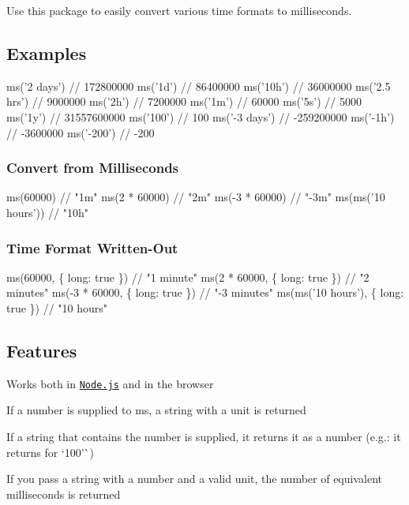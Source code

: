 \href{https://travis-ci.org/zeit/ms}{\tt } \href{https://spectrum.chat/zeit}{\tt }

Use this package to easily convert various time formats to milliseconds.

\subsection*{Examples}


\begin{DoxyCode}
ms('2 days')  // 172800000
ms('1d')      // 86400000
ms('10h')     // 36000000
ms('2.5 hrs') // 9000000
ms('2h')      // 7200000
ms('1m')      // 60000
ms('5s')      // 5000
ms('1y')      // 31557600000
ms('100')     // 100
ms('-3 days') // -259200000
ms('-1h')     // -3600000
ms('-200')    // -200
\end{DoxyCode}


\subsubsection*{Convert from Milliseconds}


\begin{DoxyCode}
ms(60000)             // "1m"
ms(2 * 60000)         // "2m"
ms(-3 * 60000)        // "-3m"
ms(ms('10 hours'))    // "10h"
\end{DoxyCode}


\subsubsection*{Time Format Written-\/\+Out}


\begin{DoxyCode}
ms(60000, \{ long: true \})             // "1 minute"
ms(2 * 60000, \{ long: true \})         // "2 minutes"
ms(-3 * 60000, \{ long: true \})        // "-3 minutes"
ms(ms('10 hours'), \{ long: true \})    // "10 hours"
\end{DoxyCode}


\subsection*{Features}


\begin{DoxyItemize}
\item Works both in \href{https://nodejs.org}{\tt Node.\+js} and in the browser
\item If a number is supplied to {\ttfamily ms}, a string with a unit is returned
\item If a string that contains the number is supplied, it returns it as a number (e.\+g.\+: it returns {} for `\textquotesingle{}100'\`{})
\item If you pass a string with a number and a valid unit, the number of equivalent milliseconds is returned
\end{DoxyItemize}

